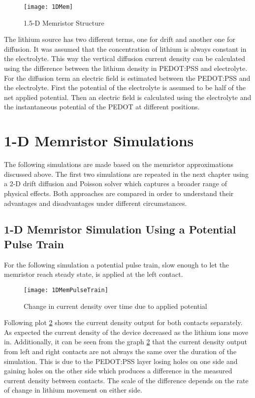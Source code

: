 \begin{doublespace}
 
\begin{figure}[!htp]
\centering
\texttt{[image: 1DMem]}
\caption{1.5-D Memristor Structure} 
\label{MemStc15}
\end{figure}

The lithium source has two different terms, one for drift and another one for diffusion. It was assumed that the concentration of lithium is always constant in the electrolyte. This way the vertical diffusion current density can be calculated using the difference between the lithium density in PEDOT:PSS and electrolyte. For the diffusion term an electric field is estimated between the PEDOT:PSS and the electrolyte. First the potential of the electrolyte is assumed to be half of the net applied potential. Then an electric field is calculated using the electrolyte and the instantaneous potential of the PEDOT at different positions.

\clearpage
\section{1-D Memristor Simulations}

The following simulations are made based on the memristor approximations discussed above. The first two simulations are repeated in the next chapter using a 2-D drift diffusion and Poisson solver which captures a broader range of physical effects. Both approaches are compared in order to understand their advantages and disadvantages under different circumstances.

\subsection{1-D Memristor Simulation Using a Potential Pulse Train}
  
For the following simulation a potential pulse train, slow enough to let the memristor reach steady state, is applied at the left contact.
\begin{figure}[!htp]
\centering
\texttt{[image: 1DMemPulseTrain]}
\caption{Change in current density over time due to applied potential} 
\label{MemResTrain}
\end{figure}
 Following plot \ref{MemResTrain} shows the current density output for both contacts separately. As expected the current density of the device decreased as the lithium ions move in. Additionally, it can be seen from the graph \ref{MemResTrain} that the current density output from left and right contacts are not always the same over the duration of the simulation. This is due to the PEDOT:PSS layer losing holes on one side and gaining holes on the other side which produces a difference in the measured current density between contacts. The scale of the difference depends on the rate of change in lithium movement on either side.


\end{doublespace}
